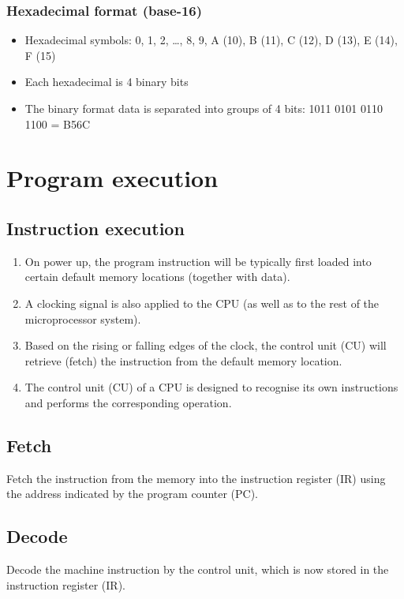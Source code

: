 \documentclass[11pt]{article}
\begin{document}
\subsubsection{Hexadecimal format (base-16)}
\label{sec:org877b96f}
\begin{itemize}
\item Hexadecimal symbols: 0, 1, 2, \ldots{}, 8, 9, A (10), B (11), C (12), D (13), E (14), F (15)
\item Each hexadecimal is 4 binary bits
\item The binary format data is separated into groups of 4 bits:
1011 0101 0110 1100 = B56C
\end{itemize}


\section{Program execution}
\label{sec:orgdff6ab6}

\subsection{Instruction execution}
\label{sec:org9abc50f}
\begin{enumerate}
\item On power up, the program instruction will be typically first loaded into certain default memory locations (together with data).
\item A clocking signal is also applied to the CPU (as well as to the rest of the microprocessor system).
\item Based on the rising or falling edges of the clock, the control unit (CU) will retrieve (fetch) the instruction from the default memory location.
\item The control unit (CU) of a CPU is designed to recognise its own instructions and performs the corresponding operation.
\end{enumerate}

 \newpage

\subsection{Fetch}
\label{sec:org7a2afb9}
Fetch the instruction from the memory into the instruction register (IR) using the address indicated by the program counter (PC).

\subsection{Decode}
\label{sec:org8b7c252}
Decode the machine instruction by the control unit, which is now stored in the instruction register (IR).
\end{document}
